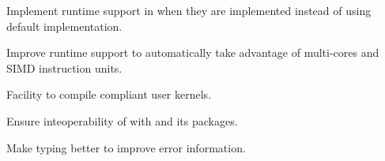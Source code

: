 \begin{workpackage}[id=hpc,wphases=36-48,
  title=High Performance Computing,
  PSRM=1, %
  LLRM=12, %
  SARM=1, %
  UKRM=1, %
  UBRM=1, %
  UJFRM=12]
\begin{wpdelivs}
  \begin{wpdeliv}[due=6,id=pythran_cython,dissem=??,nature=??]
      {Implement \Pythran runtime support in \Cython when they are implemented instead of using default implementation.}
\end{wpdeliv}
  \begin{wpdeliv}[due=3,id=pythran_runtime,dissem=??,nature=??]
      {Improve \Pythran runtime support to automatically take advantage of multi-cores and SIMD instruction units.}
\end{wpdeliv}
  \begin{wpdeliv}[due=2,id=pythran_sage,dissem=??,nature=??]
      {Facility to compile \Pythran compliant user kernels.}
\end{wpdeliv}
  \begin{wpdeliv}[due=1,id=pythran,dissem=??,nature=??]
      {Ensure inteoperability of \Pythran with \Python and its packages.}
\end{wpdeliv}
  \begin{wpdeliv}[due=12,id=pythran_typing,dissem=??,nature=??]
      {Make \Pythran typing better to improve error information.}
\end{wpdeliv}
\end{wpdelivs}
\end{workpackage}

